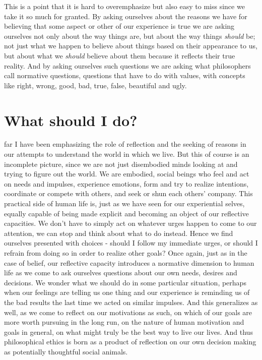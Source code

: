 \documentclass[justified]{tufte-book}
\begin{document}
This is a point that it is hard to overemphasize but also easy to miss since we take it so much for granted. By asking ourselves about the reasons we have for believing that some aspect or other of our experience is true we are asking ourselves not only about the way things are, but about the way things \emph{should} be; not just what we happen to believe about things based on their appearance to us, but about what we \emph{should} believe about them because it reflects their true reality. And by asking ourselves such questions we are asking what philosophers call normative questions, questions that have to do with values, with concepts like right, wrong, good, bad, true, false, beautiful and ugly.

\hypertarget{what-should-i-do}{%
\section{What should I do?}\label{what-should-i-do}}

 far I have been emphasizing the role of reflection and the seeking of reasons in our attempts to understand the world in which we live. But this of course is an incomplete picture, since we are not just disembodied minds looking at and trying to figure out the world. We are embodied, social beings who feel and act on needs and impulses, experience emotions, form and try to realize intentions, coordinate or compete with others, and seek or shun each others' company. This practical side of human life is, just as we have seen for our experiential selves, equally capable of being made explicit and becoming an object of our reflective capacities. We don't have to simply act on whatever urges happen to come to our attention, we can stop and think about what to do instead. Hence we find ourselves presented with choices - should I follow my immediate urges, or should I refrain from doing so in order to realize other goals? Once again, just as in the case of belief, our reflective capacity introduces a normative dimension to human life as we come to ask ourselves questions about our own needs, desires and decisions. We wonder what we should do in some particular situation, perhaps when our feelings are telling us one thing and our experience is reminding us of the bad results the last time we acted on similar impulses. And this generalizes as well, as we come to reflect on our motivations as such, on which of our goals are more worth pursuing in the long run, on the nature of human motivation and goals in general, on what might truly be the best way to live our lives. And thus philosophical ethics is born as a product of reflection on our own decision making as potentially thoughtful social animals.
\end{document}
